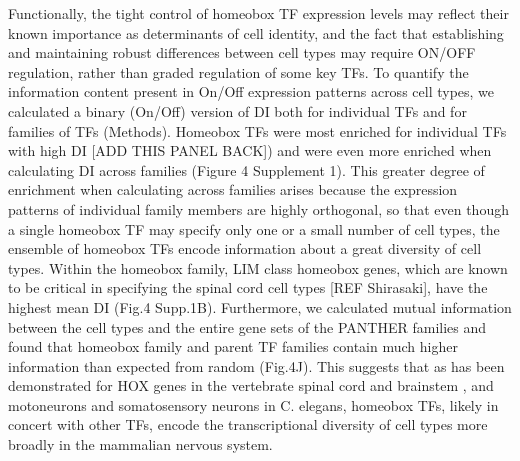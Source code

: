 Functionally, the tight control of homeobox TF expression levels may reflect their known importance as determinants of cell identity, and the fact that establishing and maintaining robust differences between cell types may require ON/OFF regulation, rather than graded regulation of some key TFs. To quantify the information content present in On/Off expression patterns across cell types, we calculated a binary (On/Off) version of DI both for individual TFs and for families of TFs (Methods). Homeobox TFs were most enriched for individual TFs with high DI [ADD THIS PANEL BACK]) and were even more enriched when calculating DI across families (Figure 4 Supplement 1). This greater degree of enrichment when calculating across families arises because the expression patterns of individual family members are highly orthogonal, so that even though a single homeobox TF may specify only one or a small number of cell types, the ensemble of homeobox TFs encode information about a great diversity of cell types. Within the homeobox family, LIM class homeobox genes, which are known to be critical in specifying the spinal cord cell types [REF Shirasaki], have the highest mean DI (Fig.4 Supp.1B). Furthermore, we calculated mutual information between the cell types and the entire gene sets of the PANTHER families and found that homeobox family and parent TF families contain much higher information than expected from random (Fig.4J). This suggests that as has been demonstrated for HOX genes in the vertebrate spinal cord and brainstem \cite{Dasen_2009,Philippidou_2013}, and motoneurons \cite{Kratsios_2017} and somatosensory neurons \cite{Zheng_2015} in C. elegans, homeobox TFs, likely in concert with other TFs, encode the transcriptional diversity of cell types more broadly in the mammalian nervous system.
